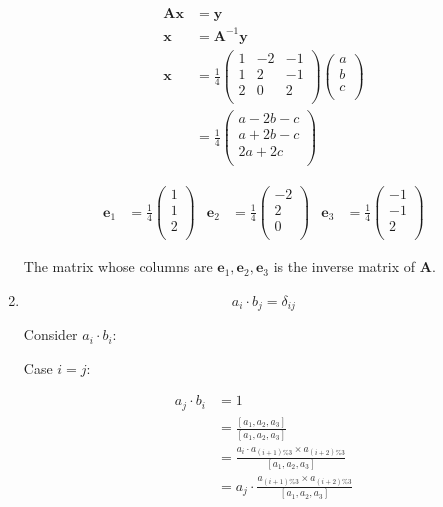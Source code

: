 \documentclass[10pt,oneside,a4paper]{article}
\begin{document}
\begin{enumerate}
\[
\begin{split}
\mathbf{A}\mathbf{x} &= \mathbf{y} \\
\mathbf{x} &= \mathbf{A}^{-1}\mathbf{y} \\
\mathbf{x} &= 
\frac{1}{4}
\begin{pmatrix}
1 & -2 & -1 \\ 
1 & 2 & -1 \\
2 & 0 & 2 \\
\end{pmatrix} 
\begin{pmatrix}
a \\ b \\ c \\
\end{pmatrix} \\
&= 
\frac{1}{4}
\begin{pmatrix}
a - 2b - c \\
a + 2b - c \\
2a + 2c \\
\end{pmatrix}
\end{split}
\]

\begin{align*}
\mathbf{e}_1 &= \frac{1}{4}\begin{pmatrix} 1 \\ 1 \\ 2 \\ \end{pmatrix} & \mathbf{e}_2 &= \frac{1}{4}\begin{pmatrix} -2 \\ 2 \\ 0 \\ \end{pmatrix} & \mathbf{e}_3 &= \frac{1}{4}\begin{pmatrix} -1 \\ -1 \\ 2 \\ \end{pmatrix} 
\end{align*}

The matrix whose columns are $\mathbf{e}_1, \mathbf{e}_2, \mathbf{e}_3$ is the inverse matrix of $\mathbf{A}$.

\item

\[
a_i\cdot b_j = \delta_{ij}
\]

Consider $a_i \cdot b_i$:

Case $i = j$:

\[
\begin{split}
a_j \cdot b_i &= 1 \\
              &= \frac{[a_1, a_2, a_3]}{[a_1, a_2, a_3]} \\
              &= \frac{a_i \cdot a_{(i + 1) \% 3} \times a_{(i + 2) \% 3}}{[a_1, a_2, a_3]} \\
              &= a_j \cdot \frac{a_{(i + 1)\% 3}\times a_{(i + 2) \% 3}}{[a_1, a_2, a_3]} \\
\end{split}
\]


\end{enumerate}
\end{document}
